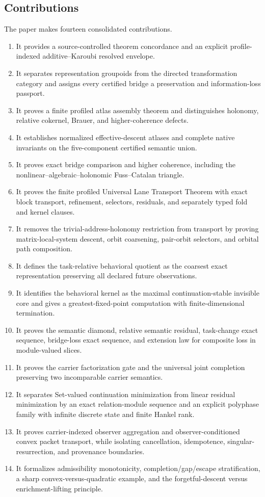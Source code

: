\documentclass[11pt]{article}
\theoremstyle{definition}
\theoremstyle{remark}
\begin{document}
\subsection{Contributions}

The paper makes fourteen consolidated contributions.
\begin{enumerate}
\item It provides a source-controlled theorem concordance and an explicit profile-indexed additive--Karoubi resolved envelope.
\item It separates representation groupoids from the directed transformation category and assigns every certified bridge a preservation and information-loss passport.
\item It proves a finite profiled atlas assembly theorem and distinguishes holonomy, relative cokernel, Brauer, and higher-coherence defects.
\item It establishes normalized effective-descent atlases and complete native invariants on the five-component certified semantic union.
\item It proves exact bridge comparison and higher coherence, including the nonlinear--algebraic--holonomic Fuss--Catalan triangle.
\item It proves the finite profiled Universal Lane Transport Theorem with exact block transport, refinement, selectors, residuals, and separately typed fold and kernel clauses.
\item It removes the trivial-address-holonomy restriction from transport by proving matrix-local-system descent, orbit coarsening, pair-orbit selectors, and orbital path composition.
\item It defines the task-relative behavioral quotient as the coarsest exact representation preserving all declared future observations.
\item It identifies the behavioral kernel as the maximal continuation-stable invisible core and gives a greatest-fixed-point computation with finite-dimensional termination.
\item It proves the semantic diamond, relative semantic residual, task-change exact sequence, bridge-loss exact sequence, and extension law for composite loss in module-valued slices.
\item It proves the carrier factorization gate and the universal joint completion preserving two incomparable carrier semantics.
\item It separates Set-valued continuation minimization from linear residual minimization by an exact relation-module sequence and an explicit polyphase family with infinite discrete state and finite Hankel rank.
\item It proves carrier-indexed observer aggregation and observer-conditioned convex packet transport, while isolating cancellation, idempotence, singular-resurrection, and provenance boundaries.
\item It formalizes admissibility monotonicity, completion/gap/escape stratification, a sharp convex-versus-quadratic example, and the forgetful-descent versus enrichment-lifting principle.
\end{enumerate}
\end{document}
